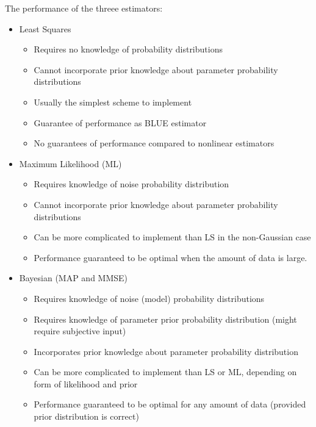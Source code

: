 \documentclass[12pt]{article}
\begin{document}
The performance of the threee estimators:
\begin{itemize}
    \item Least Squares
    \begin{itemize}
        \item Requires no knowledge of probability distributions 
        \item Cannot incorporate prior knowledge about parameter probability distributions
        \item Usually the simplest scheme to implement
        \item Guarantee of performance as BLUE estimator 
        \item No guarantees of performance compared to nonlinear estimators
    \end{itemize}
    \item Maximum Likelihood (ML)
    \begin{itemize}
    \item Requires knowledge of noise probability distribution
    \item Cannot incorporate prior knowledge about parameter probability distributions 
    \item Can be more complicated to implement than LS in the non-Gaussian case
    \item Performance guaranteed to be optimal when the amount of data is large.
    \end{itemize}
    \item Bayesian (MAP and MMSE)
    \begin{itemize}
        \item Requires knowledge of noise (model) probability distributions
        \item Requires knowledge of parameter prior probability distribution (might require subjective input)
        \item Incorporates prior knowledge about parameter probability distribution
        \item Can be more complicated to implement than LS or ML, depending on form of likelihood and prior
        \item Performance guaranteed to be optimal for any amount of data (provided prior distribution is correct)
    \end{itemize}
\end{itemize}
\end{document}

